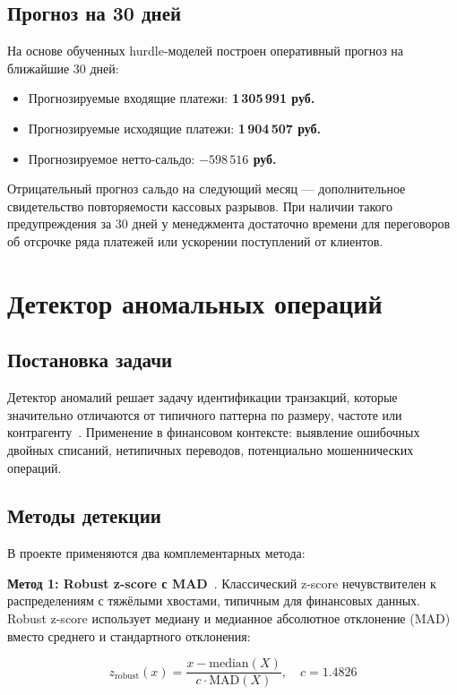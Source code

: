 \subsection{Прогноз на 30 дней}

На основе обученных hurdle-моделей построен оперативный прогноз на ближайшие 30 дней:
\begin{itemize}
  \item Прогнозируемые входящие платежи: \textbf{1\,305\,991 руб.}
  \item Прогнозируемые исходящие платежи: \textbf{1\,904\,507 руб.}
  \item Прогнозируемое нетто-сальдо: \textbf{$-598\,516$ руб.}
\end{itemize}

Отрицательный прогноз сальдо на следующий месяц --- дополнительное свидетельство повторяемости кассовых разрывов. При наличии такого предупреждения за 30 дней у менеджмента достаточно времени для переговоров об отсрочке ряда платежей или ускорении поступлений от клиентов.

\section{Детектор аномальных операций}

\subsection{Постановка задачи}

Детектор аномалий решает задачу идентификации транзакций, которые значительно отличаются от типичного паттерна по размеру, частоте или контрагенту~\cite{chandola2009anomaly}. Применение в финансовом контексте: выявление ошибочных двойных списаний, нетипичных переводов, потенциально мошеннических операций.

\subsection{Методы детекции}

В проекте применяются два комплементарных метода:

\textbf{Метод 1: Robust z-score с MAD}~\cite{rousseeuw1993alternatives}. Классический z-score нечувствителен к распределениям с тяжёлыми хвостами, типичным для финансовых данных. Robust z-score использует медиану и медианное абсолютное отклонение (MAD) вместо среднего и стандартного отклонения:

\begin{equation}
z_\text{robust}(x) = \frac{x - \text{median}(X)}{c \cdot \text{MAD}(X)}, \quad c = 1.4826
\end{equation}

